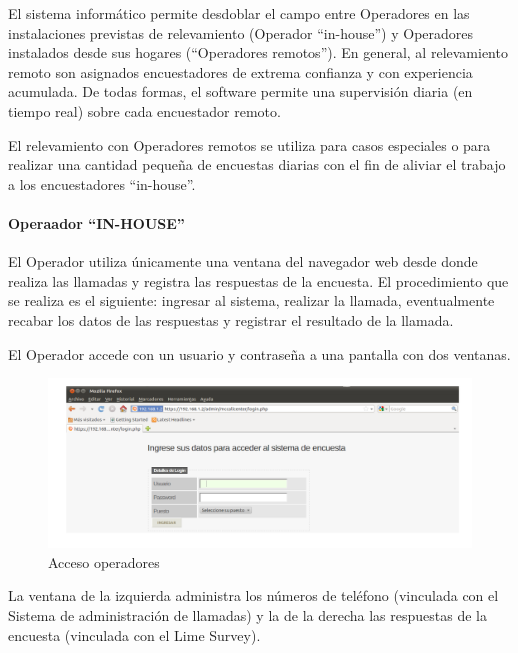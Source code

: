 \documentclass[
  openany]{book}
\begin{document}
El sistema informático permite desdoblar el campo entre Operadores en las instalaciones previstas de relevamiento (Operador ``in-house'') y Operadores instalados desde sus hogares (``Operadores remotos''). En general, al relevamiento remoto son asignados encuestadores de extrema confianza y con experiencia acumulada. De todas formas, el software permite una supervisión diaria (en tiempo real) sobre cada encuestador remoto.

El relevamiento con Operadores remotos se utiliza para casos especiales o para realizar una cantidad pequeña de encuestas diarias con el fin de aliviar el trabajo a los encuestadores ``in-house''.

\hypertarget{operaador-in-house}{%
\paragraph{Operaador ``IN-HOUSE''}\label{operaador-in-house}}

El Operador utiliza únicamente una ventana del navegador web desde donde realiza las llamadas y registra las respuestas de la encuesta. El procedimiento que se realiza es el siguiente: ingresar al sistema, realizar la llamada, eventualmente recabar los datos de las respuestas y registrar el resultado de la llamada.

El Operador accede con un usuario y contraseña a una pantalla con dos ventanas.

\begin{figure}

{\centering \includegraphics[width=1\linewidth]{imagenes/figura6-14} 

}

\caption{Acceso operadores}\label{fig:Acce}
\end{figure}

La ventana de la izquierda administra los números de teléfono (vinculada con el Sistema de administración de llamadas) y la de la derecha las respuestas de la encuesta (vinculada con el Lime Survey).
\end{document}
